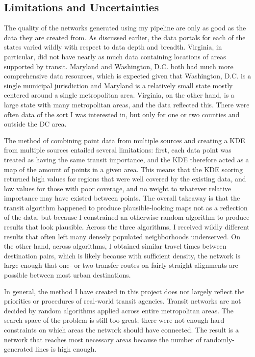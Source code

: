 \documentclass[manuscript]{acmart}
\begin{document}
\subsection{Limitations and Uncertainties}
The quality of the networks generated using my pipeline are only as good as the data they are created from. As discussed earlier, the data portals for each of the states varied wildly with respect to data depth and breadth. Virginia, in particular, did not have nearly as much data containing locations of areas supported by transit. Maryland and Washington, D.C. both had much more comprehensive data resources, which is expected given that Washington, D.C. is a single municipal jurisdiction and Maryland is a relatively small state mostly centered around a single metropolitan area. Virginia, on the other hand, is a large state with many metropolitan areas, and the data reflected this. There were often data of the sort I was interested in, but only for one or two counties and outside the DC area. 

The method of combining point data from multiple sources and creating a KDE from multiple sources entailed several limitations: first, each data point was treated as having the same transit importance, and the KDE therefore acted as a map of the amount of points in a given area. This means that the KDE scoring returned high values for regions that were well covered by the existing data, and low values for those with poor coverage, and no weight to whatever relative importance may have existed between points. The overall takeaway is that the transit algorithm happened to produce plausible-looking maps not as a reflection of the data, but because I constrained an otherwise random algorithm to produce results that look plausible. Across the three algorithms, I received wildly different results that often left many densely populated neighborhoods underserved. On the other hand, across algorithms, I obtained similar travel times between destination pairs, which is likely because with sufficient density, the network is large enough that one- or two-transfer routes on fairly straight alignments are possible between most urban destinations.

In general, the method I have created in this project does not largely reflect the priorities or procedures of real-world transit agencies. Transit networks are not decided by random algorithms applied across entire metropolitan areas. The search space of the problem is still too great; there were not enough hard constraints on which areas the network should have connected. The result is a network that reaches most necessary areas because the number of randomly-generated lines is high enough. 
\end{document}
